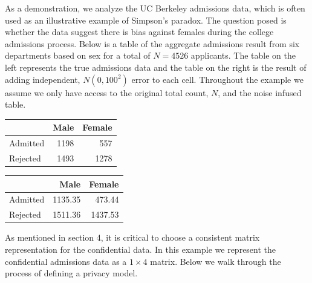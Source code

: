 As a demonstration, we analyze the UC Berkeley admissions data, which is often
used as an illustrative example of Simpson's paradox. The question posed is whether
the data suggest there is bias against females during the college admissions
process. Below is a table of the aggregate admissions result from six departments based on sex
for a total of \(N = 4526\) applicants. The table on the left represents
the true admissions data and the table on the right is the result of adding
independent, \(N(0,100^2)\) error to each cell. Throughout the example
we assume we only have access to the original total count, \(N\), and
the noise infused table.

\begin{table}[!h]

\centering
\begin{tabular}[t]{lrr}
\toprule
  & Male & Female\\
\midrule
Admitted & 1198 & 557\\
Rejected & 1493 & 1278\\
\bottomrule
\end{tabular}
\centering
\begin{tabular}[t]{lrr}
\toprule
  & Male & Female\\
\midrule
Admitted & 1135.35 & 473.44\\
Rejected & 1511.36 & 1437.53\\
\bottomrule
\end{tabular}
\end{table}

As mentioned in section 4, it is critical to choose a consistent
matrix representation for the confidential data. In this example
we represent the confidential admissions data as a \(1 \times 4\) matrix.
Below we walk through the process of defining a privacy model.

